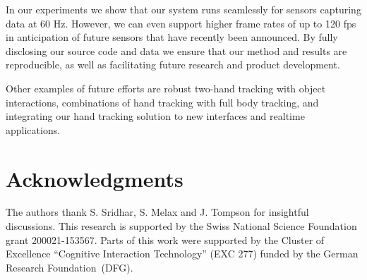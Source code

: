 In our experiments we show that our system runs seamlessly for sensors capturing data at 60 Hz. However,  we can even support higher frame rates of up to 120 fps in anticipation of future sensors that have recently been announced.
By fully disclosing our source code and data we ensure that our method and results are reproducible, as well as facilitating future research and product development. 

Other examples of future efforts are robust two-hand tracking with object interactions, combinations of hand tracking with full body tracking, and integrating our hand tracking solution to new interfaces and realtime applications.



\section*{Acknowledgments}
The authors thank S. Sridhar, S. Melax and J. Tompson for insightful discussions. This research is supported by the Swiss National Science Foundation grant 200021-153567. Parts of this work were supported by the Cluster of Excellence ``Cognitive Interaction Technology'' (EXC 277) funded by the German Research Foundation~(DFG).

